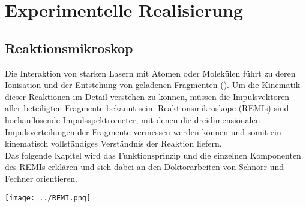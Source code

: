 \chapter{Experimentelle Realisierung} 
%
%
%
%
\section{Reaktionsmikroskop}



Die Interaktion von starken Lasern mit Atomen oder Molekülen führt zu deren Ionisation und der Entstehung von geladenen Fragmenten (\cite{hertel2011}). Um die Kinematik dieser Reaktionen im Detail verstehen zu können, müssen die Impulsvektoren aller beteiligten Fragmente bekannt sein. Reaktionsmikroskope (REMIs) sind hochauflösende Impulsspektrometer, mit denen die dreidimensionalen Impulsverteilungen der Fragmente vermessen werden können und somit ein kinematisch vollständiges Verständnis der Reaktion liefern. \\
Das folgende Kapitel wird das Funktionsprinzip und die einzelnen Komponenten des REMIs erklären und sich dabei an den Doktorarbeiten von Schnorr \cite{Schn14} und Fechner \cite{Fech14} orientieren. %
\begin{center}
\begin{minipage}{\linewidth}
\centering
\texttt{[image: ../REMI.png]}%
 \label{fig:REMI} 
\end{minipage} 
\end{center} 

